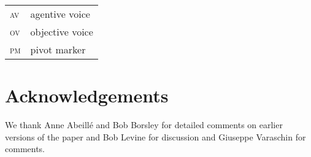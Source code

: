 \documentclass[output=paper
 	        ,biblatex
                ,babelshorthands
                ,newtxmath
                ,draftmode
                ,colorlinks, citecolor=brown
]{langscibook}
\begin{document}
\begin{tabularx}{.99\textwidth}{@{}lX}
\textsc{av} & agentive voice\\
\textsc{ov} & objective voice\\
\textsc{pm} & pivot marker\\
\end{tabularx}




\section*{Acknowledgements}


We thank Anne Abeillé and Bob Borsley for detailed comments on earlier versions of the paper and Bob Levine for discussion and Giuseppe Varaschin for comments.








{\sloppy
\printbibliography[heading=subbibliography,notkeyword=this]
}
\end{document}
